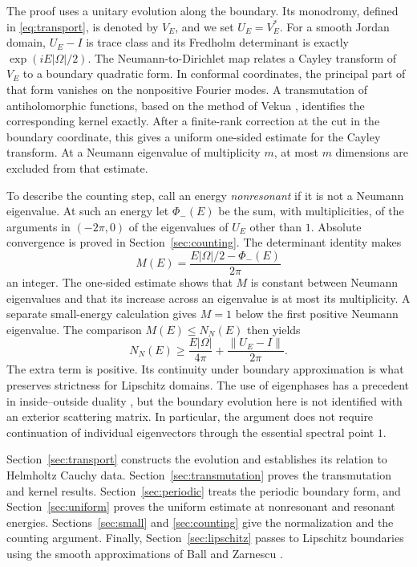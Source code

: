 \documentclass[11pt]{amsart}
\numberwithin{equation}{section}
\begin{document}
The proof uses a unitary evolution along the boundary. Its monodromy,
defined in \eqref{eq:transport}, is denoted by $V_E$, and we set
$U_E=V_E^*$. For a smooth Jordan domain, $U_E-I$ is trace class and
its Fredholm determinant is exactly $\exp(iE|\Omega|/2)$. The
Neumann-to-Dirichlet map relates a Cayley transform of $V_E$ to a
boundary quadratic form. In conformal coordinates, the principal
part of that form vanishes on the nonpositive Fourier modes. A
transmutation of antiholomorphic functions, based on the method of
Vekua \cite{Vekua,MHP}, identifies the corresponding kernel exactly.
After a finite-rank correction at the cut in the boundary coordinate,
this gives a uniform one-sided estimate for the Cayley transform.
At a Neumann eigenvalue of multiplicity $m$, at most $m$ dimensions
are excluded from that estimate.

To describe the counting step, call an energy \emph{nonresonant} if
it is not a Neumann eigenvalue. At such an energy let $\Phi_-(E)$
be the sum, with multiplicities, of the arguments in $(-2\pi,0)$ of
the eigenvalues of $U_E$ other than $1$. Absolute convergence is proved
in Section~\ref{sec:counting}. The determinant identity makes
\begin{equation}\label{eq:integer-intro}
 M(E)=\frac{E|\Omega|/2-\Phi_-(E)}{2\pi}
\end{equation}
an integer. The one-sided estimate shows that $M$ is constant between
Neumann eigenvalues and that its increase across an eigenvalue is at
most its multiplicity. A separate small-energy calculation gives
$M=1$ below the first positive Neumann eigenvalue. The comparison
$M(E)\le N_N(E)$ then yields
\[
 N_N(E)\ge\frac{E|\Omega|}{4\pi}
             +\frac{\|U_E-I\|}{2\pi}.
\]
The extra term is positive. Its continuity under boundary
approximation is what preserves strictness for Lipschitz domains.
The use of eigenphases has a precedent in inside--outside duality
\cite{EP}, but the boundary evolution here is not identified with an
exterior scattering matrix. In particular, the argument does not
require continuation of individual eigenvectors through the
essential spectral point $1$.

Section~\ref{sec:transport} constructs the evolution and establishes
its relation to Helmholtz Cauchy data. Section~\ref{sec:transmutation}
proves the transmutation and kernel results.
Section~\ref{sec:periodic} treats the periodic boundary form, and
Section~\ref{sec:uniform} proves the uniform estimate at nonresonant
and resonant energies. Sections~\ref{sec:small} and
\ref{sec:counting} give the normalization and the counting argument.
Finally, Section~\ref{sec:lipschitz} passes to Lipschitz boundaries
using the smooth approximations of Ball and Zarnescu \cite{BZ}.
\end{document}

